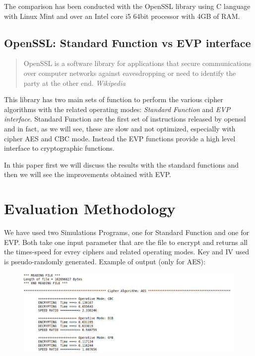 \documentclass[11pt]{article}
\begin{document}
The comparison has been conducted with the OpenSSL library using C language with Linux Mint and over an Intel core i5 64bit processor with 4GB of RAM.

\subsection{OpenSSL: Standard Function vs EVP interface}
\begin{quote}
OpenSSL is a software library for applications that secure communications over computer networks against eavesdropping or need to 
identify the party at the other end. {\em Wikipedia}
\end{quote}
This library has two main sets of function to perform the various cipher algorithms with the related operating modes: 
{\em Standard Function} and {\em EVP interface}. Standard Function are the first set of instructions released by openssl 
and in fact, as we will see, these are slow and not optimized, especially with cipher AES and CBC mode. Instead the EVP functions 
provide a high level interface to cryptographic functions. 

In this paper first we will discuss the results with the standard functions and then we will see the improvements obtained with EVP.

\section{Evaluation Methodology}
We have used two Simulations Programs, one for Standard Function and one for EVP. Both take one input parameter that are the file to encrypt and 
returns all the times-speed for evrey ciphers and related operating modes. Key and IV used is pseudo-randomly generated. Example of output (only for AES):

\begin{figure}[!ht]
  \includegraphics[width=1\textwidth]{pic1-hw1-1635747}
  \label{fig:Example of output with EVP}
\end{figure}
\end{document}
